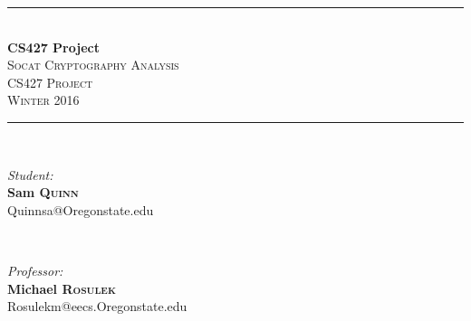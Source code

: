 \documentclass[letterpaper,11pt,notitlepage,fleqn]{article}
\begin{document}
\begin{titlepage}
\vspace*{\fill}

\newcommand{\HRule}{\rule{\linewidth}{0.5mm}} %

\center %


\HRule \\[0.4cm]
{ \huge \bfseries CS427 Project}\\[0.4cm] %


\textsc{\LARGE Socat Cryptography Analysis}\\[0.5cm] %
\textsc{\Large CS427 Project}\\[0.5cm] %
\textsc{\large Winter 2016}\\[0.5cm] %


\HRule \\[1.5cm]

\begin{minipage}{0.4\textwidth}
\begin{flushleft} \large
\emph{Student:}\\
        \textbf{Sam \textsc{Quinn}} \\ %
        {\small Quinnsa@Oregonstate.edu}
        \end{flushleft}
        \end{minipage}
        ~
        \begin{minipage}{0.4\textwidth}
        \begin{flushright} \large
        \emph{Professor:} \\
            \textbf{Michael \textsc{Rosulek}} \\ %
            {\small Rosulekm@eecs.Oregonstate.edu}
            \end{flushright}
            \end{minipage}\\[3cm]


\end{titlepage}
\end{document}
